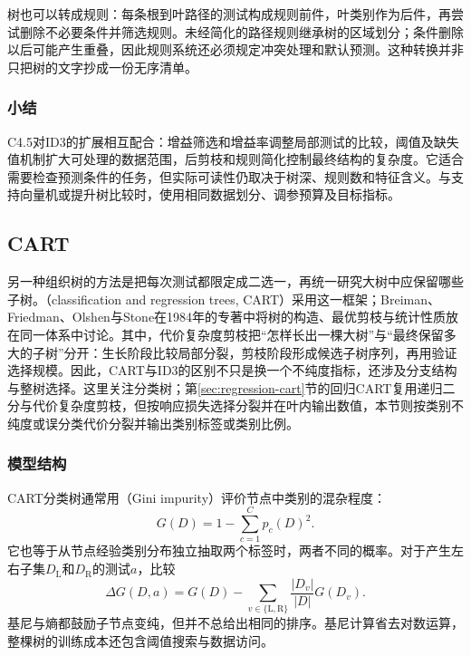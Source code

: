 树也可以转成规则：每条根到叶路径的测试构成规则前件，叶类别作为后件，再尝试删除不必要条件并筛选规则。未经简化的路径规则继承树的区域划分；条件删除以后可能产生重叠，因此规则系统还必须规定冲突处理和默认预测。这种转换并非只把树的文字抄成一份无序清单。

\subsubsection{小结}
\label{sec:classification-c45-summary}

C4.5对ID3的扩展相互配合：增益筛选和增益率调整局部测试的比较，阈值及缺失值机制扩大可处理的数据范围，后剪枝和规则简化控制最终结构的复杂度。它适合需要检查预测条件的任务，但实际可读性仍取决于树深、规则数和特征含义。与支持向量机或提升树比较时，使用相同数据划分、调参预算及目标指标。

\subsection{CART}
\label{sec:classification-cart}

另一种组织树的方法是把每次测试都限定成二选一，再统一研究大树中应保留哪些子树。（classification and regression trees, CART）采用这一框架；Breiman、Friedman、Olshen与Stone在1984年的专著中将树的构造、最优剪枝与统计性质放在同一体系中讨论。其中，代价复杂度剪枝把“怎样长出一棵大树”与“最终保留多大的子树”分开：生长阶段比较局部分裂，剪枝阶段形成候选子树序列，再用验证选择规模。因此，CART与ID3的区别不只是换一个不纯度指标，还涉及分支结构与整树选择。这里关注分类树；第\ref{sec:regression-cart}节的回归CART复用递归二分与代价复杂度剪枝，但按响应损失选择分裂并在叶内输出数值，本节则按类别不纯度或误分类代价分裂并输出类别标签或类别比例。

\subsubsection{模型结构}
\label{sec:classification-cart-structure}

CART分类树通常用（Gini impurity）评价节点中类别的混杂程度：
\begin{equation}
  G(D)=1-\sum_{c=1}^{C}p_c(D)^2.
  \label{eq:classification-gini}
\end{equation}
它也等于从节点经验类别分布独立抽取两个标签时，两者不同的概率。对于产生左右子集$D_{\mathrm{L}}$和$D_{\mathrm{R}}$的测试$a$，比较
\begin{equation}
  \Delta G(D,a)=G(D)
  -\sum_{v\in\{\mathrm{L},\mathrm{R}\}}
  \frac{|D_v|}{|D|}G(D_v).
  \label{eq:classification-gini-decrease}
\end{equation}
基尼与熵都鼓励子节点变纯，但并不总给出相同的排序。基尼计算省去对数运算，整棵树的训练成本还包含阈值搜索与数据访问。

